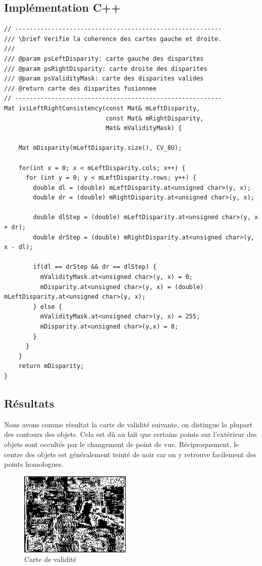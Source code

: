 \documentclass[a4paper]{article}
\begin{document}
\clearpage
\subsection{Implémentation C++}

\begin{lstlisting}
// ---------------------------------------------------------
/// \brief Verifie la coherence des cartes gauche et droite.
///
/// @param psLeftDisparity: carte gauche des disparites
/// @param psRightDisparity: carte droite des disparites
/// @param psValidityMask: carte des disparites valides
/// @return carte des disparites fusionnee
// ---------------------------------------------------------
Mat iviLeftRightConsistency(const Mat& mLeftDisparity,
                            const Mat& mRightDisparity,
                            Mat& mValidityMask) {

    Mat mDisparity(mLeftDisparity.size(), CV_8U);

    for(int x = 0; x < mLeftDisparity.cols; x++) {
      for (int y = 0; y < mLeftDisparity.rows; y++) {
        double dl = (double) mLeftDisparity.at<unsigned char>(y, x);
        double dr = (double) mRightDisparity.at<unsigned char>(y, x);

        double dlStep = (double) mLeftDisparity.at<unsigned char>(y, x + dr);
        double drStep = (double) mRightDisparity.at<unsigned char>(y, x - dl);

        if(dl == drStep && dr == dlStep) {
          mValidityMask.at<unsigned char>(y, x) = 0;
          mDisparity.at<unsigned char>(y, x) = (double) mLeftDisparity.at<unsigned char>(y, x);
        } else {
          mValidityMask.at<unsigned char>(y, x) = 255;
          mDisparity.at<unsigned char>(y,x) = 0;
        }
      }
    }
    return mDisparity;
}
\end{lstlisting}

\subsection{Résultats}

Nous avons comme résultat la carte de validité suivante, on distingue la plupart des contours des objets. Cela est dû au fait que certains points sur l'extérieur des objets sont occultés par le changement de point de vue. Réciproquement, le centre des objets est généralement teinté de noir car on y retrouve facilement des points homologues.

\begin{figure}[h]
\begin{center}
	\includegraphics[width=200px]{validity-mask.png}
\end{center}
\caption{Carte de validité}
\end{figure}
\end{document}
